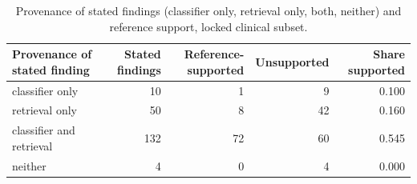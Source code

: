 \begin{table}[t]
\centering
\scriptsize
\begin{tabular}{lrrrr}
\hline
Provenance of stated finding & Stated findings & Reference-supported & Unsupported & Share supported \\
\hline
classifier only & 10 & 1 & 9 & 0.100 \\
retrieval only & 50 & 8 & 42 & 0.160 \\
classifier and retrieval & 132 & 72 & 60 & 0.545 \\
neither & 4 & 0 & 4 & 0.000 \\
\hline
\end{tabular}
\caption{Provenance of stated findings (classifier only, retrieval only, both, neither) and reference support, locked clinical subset.}
\label{tab:table11_supplementary_provenance}
\end{table}
